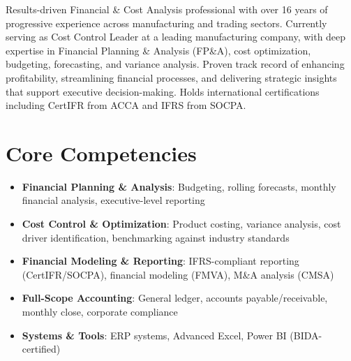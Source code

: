 \documentclass[11pt,a4paper,sans]{moderncv}
\begin{document}
\makecvtitle


\vspace{6pt}
\small{Results-driven Financial \& Cost Analysis professional with over 16 years of progressive experience across manufacturing and trading sectors. Currently serving as Cost Control Leader at a leading manufacturing company, with deep expertise in Financial Planning \& Analysis (FP\&A), cost optimization, budgeting, forecasting, and variance analysis. Proven track record of enhancing profitability, streamlining financial processes, and delivering strategic insights that support executive decision-making. Holds international certifications including CertIFR from ACCA and IFRS from SOCPA.}


\section{Core Competencies}
\vspace{1pt}
\begin{itemize}

\item \textbf{Financial Planning \& Analysis}: Budgeting, rolling forecasts, monthly financial analysis, executive-level reporting

\item \textbf{Cost Control \& Optimization}: Product costing, variance analysis, cost driver identification, benchmarking against industry standards

\item \textbf{Financial Modeling \& Reporting}: IFRS-compliant reporting (CertIFR/SOCPA), financial modeling (FMVA), M\&A analysis (CMSA)

\item \textbf{Full-Scope Accounting}: General ledger, accounts payable/receivable, monthly close, corporate compliance

\item \textbf{Systems \& Tools}: ERP systems, Advanced Excel, Power BI (BIDA-certified)

\end{itemize}

\end{document}
